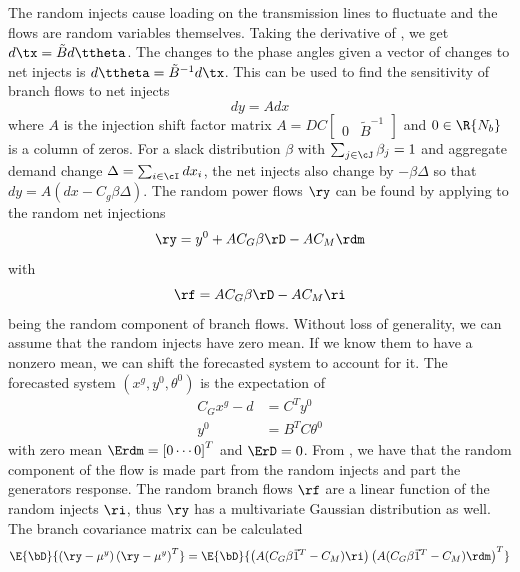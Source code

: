 The random injects cause loading on the transmission lines to fluctuate and the flows are random variables themselves. Taking the derivative of , we get $d \tx = \tilde{B} d \ttheta $.  The changes to the phase angles given a vector of changes to net injects is $ d \ttheta = \tilde{B}^{-1} d \tx $.  This can be used to find the sensitivity of branch flows to net injects 
\begin{equation}\label{isf}
 d y = A d x 
\end{equation}
where $A$ is the injection shift factor matrix $A = D C \left[\begin{array}{cc} 0 & \tilde{B}^{-1} \end{array} \right]$ and $0\in \R{N_b}$ is a column of zeros.  For a slack distribution $\beta$ with $\sum_{j \in \cJ} \beta_j=1$ and aggregate demand change $\Delta = \sum_{i \in \cI} dx_i$, the net injects also change by $- \beta \Delta$ so that $dy = A\left( dx - C_g \beta \Delta \right)$.  The random power flows $\ry$ can be found by applying  to the random net injections 
\begin{equation}\label{rand_flow}
 \ry = y^0+ A C_G \beta \rD  - A C_M \rdm 
\end{equation}
with 
\begin{equation}
\rf = A C_G \beta \rD - AC_M \ri
\end{equation}
being the random component of branch flows.
Without loss of generality, we can assume that the random injects have zero mean.  If we know them to have a nonzero mean, we can shift the forecasted system to account for it. 
The forecasted system  $\left(x^g, y^0, \theta^0\right)$ is the expectation of 
\begin{align*}
C_G x^g - d &= C^T y^0 \\
y^0 &= B^T C \theta^0 
\end{align*}
with zero mean $\Erdm=\left[0 \cdots 0\right]^T$ and $\ErD=0$. 
From , we have that the random component of the flow is made part from the random injects and part the generators response.   The random branch flows $\rf$ are a linear function of the random injects $\ri$, thus $\ry$ has a multivariate Gaussian distribution as well.  The branch covariance matrix can be calculated
\begin{equation*}
\E{\bD}{ \left( \ry - \mu^y \right) \left( \ry - \mu^y \right)^T } = \E{\bD}{\left( A(C_G\beta \vec{1}^T - C_M) \ri \right) \left( A(C_G\beta \vec{1}^T - C_M )\rdm \right)^T } 
\end{equation*}
